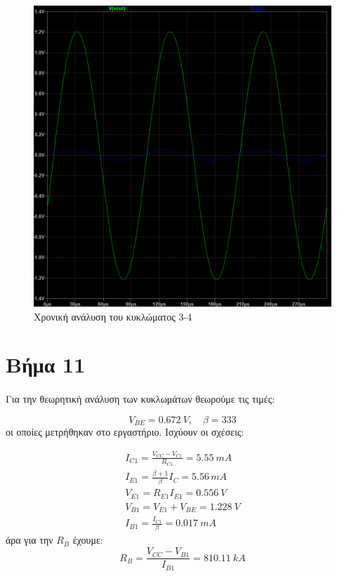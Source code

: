 \documentclass[11pt,a4paper,twoside,onecolumn,openright,final]{memoir}
\begin{document}
\begin{figure}[H]
\centerfloat
\includegraphics[width=12.0cm]{figures/exercise3_4transient.png}
\caption{Χρονική ανάλυση του κυκλώματος 3-4}
\label{fig:ex3plottransient}
\end{figure}

\section{Βήμα 11}

\paragraph*{}

Για την θεωρητική ανάλυση των κυκλωμάτων θεωρούμε τις τιμές:

\[
V_{BE} = 0.672\ V, \quad \beta = 333
\]
οι οποίες μετρήθηκαν στο εργαστήριο. Ισχύουν οι σχέσεις:

\begin{gather*}
I_{C1} = \frac{V_{CC} - V_{C1}}{R_{C1}} =  5.55\ mA \\
I_{E1} = \frac{\beta + 1}{\beta} I_C = 5.56\, mA \\
V_{E1} = R_{E1}I_{E1} = 0.556 \ V \\
V_{B1} = V_{E1} + V_{BE} = 1.228 \ V \\
I_{B1} = \frac{I_{C1}}{\beta} = 0.017 \ mA
\end{gather*}
άρα για την \(R_B\) έχουμε:
\[
R_B = \frac{V_{CC}-V_{B1}}{I_{B1}} = 810.11\ kA
\]
\end{document}
